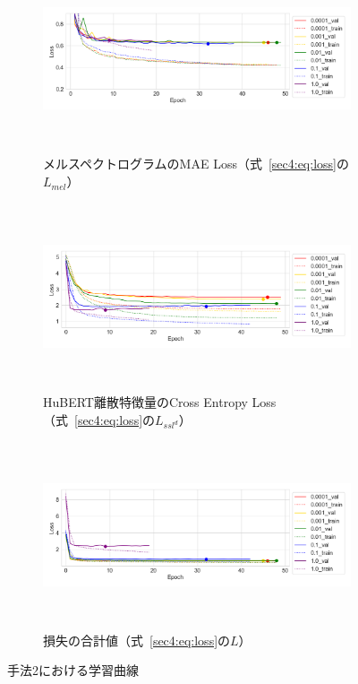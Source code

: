 \documentclass[12pt]{jarticle}
\numberwithin{equation}{section}    %
\numberwithin{figure}{section}      %
\numberwithin{table}{section}      %
\begin{document}
\begin{figure}[bt]
    \centering
    \begin{subfigure}{\linewidth}
        \centering
        \includegraphics[height=55mm]{./figure/sec4/learning_curve/impact_of_loss_weights_across_methods/2/mel_loss.png}
        \caption{メルスペクトログラムのMAE Loss（式~\eqref{sec4:eq:loss}の$L_{mel}$）}
        \label{sec4:fig:learning_curve_method_2_val_mel_loss}
    \end{subfigure}
    \begin{subfigure}{\linewidth}
        \centering
        \includegraphics[height=55mm]{./figure/sec4/learning_curve/impact_of_loss_weights_across_methods/2/ssl_feature_cluster_loss.png}
        \caption{HuBERT離散特徴量のCross Entropy Loss（式~\eqref{sec4:eq:loss}の$L_{ssl^{d}}$）}
        \label{sec4:fig:learning_curve_method_2_val_ssl_feature_cluster_loss}
    \end{subfigure}
    \begin{subfigure}{\linewidth}
        \centering
        \includegraphics[height=55mm]{./figure/sec4/learning_curve/impact_of_loss_weights_across_methods/2/total_loss.png}
        \caption{損失の合計値（式~\eqref{sec4:eq:loss}の$L$）}
        \label{sec4:fig:learning_curve_method_2_val_total_loss}
    \end{subfigure}
    \caption{手法2における学習曲線}
    \label{sec4:fig:learning_curve_method_2_val_losses}
\end{figure}
\end{document}
